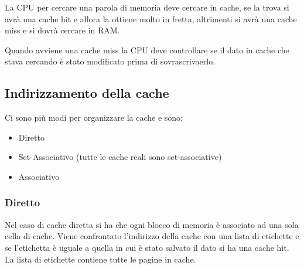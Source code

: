 \documentclass[a4paper]{article}
\theoremstyle{break}
\theoremstyle{break}
\theoremstyle{break}
\theoremstyle{break}
\begin{document}
\noindent La CPU per cercare una parola di memoria deve cercare in cache, se la trova si avrà una
cache hit e allora la
ottiene molto in fretta, altrimenti si avrà una cache miss e si dovrà cercare in RAM.

\noindent Quando avviene una cache miss la CPU deve controllare se il dato in cache che
stava cercando è stato modificato prima di sovrascrivaerlo.

\subsection{Indirizzamento della cache}
Ci sono più modi per organizzare la cache e sono:
\begin{itemize}
  \item Diretto
  \item Set-Associativo (tutte le cache reali sono set-associative)
  \item Associativo
\end{itemize}

\subsubsection{Diretto}
Nel caso di cache diretta si ha che ogni blocco di memoria è associato ad una sola
cella di cache. Viene confrontato l'indirizzo della cache con una lista di etichette
e se l'etichetta è uguale a quella in cui è stato salvato il dato si ha una cache hit.
La lista di etichette contiene tutte le pagine in cache.
\end{document}
